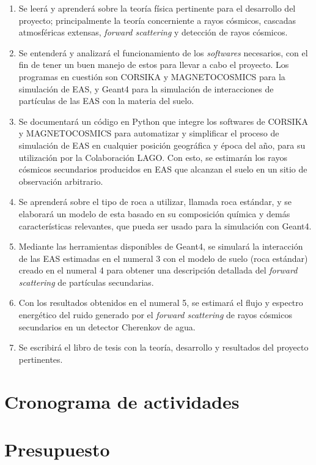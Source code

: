 \documentclass[12pt]{report}
\begin{document}
\begin{enumerate}
    \item Se leerá y aprenderá sobre la teoría física pertinente para el desarrollo del proyecto; principalmente la teoría concerniente a rayos cósmicos, cascadas atmosféricas extensas, \textit{forward scattering} y detección de rayos cósmicos.
    \item Se entenderá y analizará el funcionamiento de los \textit{softwares} necesarios, con el fin de tener un buen manejo de estos para llevar a cabo el proyecto. Los programas en cuestión son CORSIKA y MAGNETOCOSMICS para la simulación de EAS, y Geant4 para la simulación de interacciones de partículas de las EAS con la materia del suelo.
    \item Se documentará un código en Python que integre los softwares de CORSIKA y MAGNETOCOSMICS para automatizar y simplificar el proceso de simulación de EAS en cualquier posición geográfica y época del año, para su utilización por la Colaboración LAGO. Con esto, se estimarán los rayos cósmicos secundarios producidos en EAS que alcanzan el suelo en un sitio de observación arbitrario.
    \item Se aprenderá sobre el tipo de roca a utilizar, llamada roca estándar, y se elaborará un modelo de esta basado en su composición química y demás características relevantes, que pueda ser usado para la simulación con Geant4.
    \item Mediante las herramientas disponibles de Geant4, se simulará la interacción de las EAS estimadas en el numeral 3 con el modelo de suelo (roca estándar) creado en el numeral 4 para obtener una descripción detallada del \textit{forward scattering} de partículas secundarias.
    \item Con los resultados obtenidos en el numeral 5, se estimará el flujo y espectro energético del ruido generado por el \textit{forward scattering} de rayos cósmicos secundarios en un detector Cherenkov de agua.
    \item Se escribirá el libro de tesis con la teoría, desarrollo y resultados del proyecto pertinentes.
\end{enumerate}

\section*{Cronograma de actividades}

\section*{Presupuesto}




\printbibliography
\end{document}
